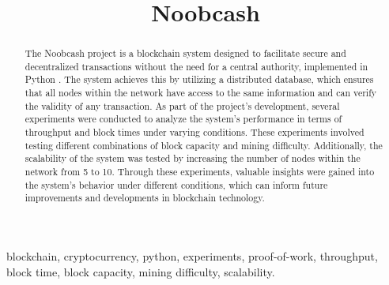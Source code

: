 \documentclass[conference]{IEEEtran}
\begin{document}
\title{Noobcash\\
}

\author{
\and
{}
\and
{}
}

\maketitle

\begin{abstract}
The Noobcash project is a blockchain system designed to facilitate secure and decentralized transactions without the need for a central authority, implemented in Python \cite{b1}. The system achieves this by utilizing a distributed database, which ensures that all nodes within the network have access to the same information and can verify the validity of any transaction. As part of the project's development, several experiments were conducted to analyze the system's performance in terms of throughput and block times under varying conditions. These experiments involved testing different combinations of block capacity and mining difficulty. Additionally, the scalability of the system was tested by increasing the number of nodes within the network from 5 to 10. Through these experiments, valuable insights were gained into the system's behavior under different conditions, which can inform future improvements and developments in blockchain technology.
\end{abstract}

\begin{IEEEkeywords}
blockchain, cryptocurrency, python, experiments, proof-of-work, throughput, block time, block capacity, mining difficulty, scalability.
\end{IEEEkeywords}
\end{document}
